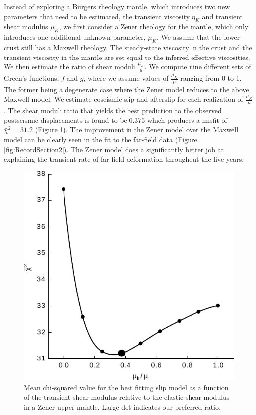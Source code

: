 \documentclass[draft,linenumbers]{AGUJournal}
\begin{document}
Instead of exploring a Burgers rheology mantle, which introduces two new parameters that need to be estimated, the transient viscosity $\eta_{K}$ and transient shear modulus $\mu_{K}$, we first consider a Zener rheology for the mantle, which only introduces one additional unknown parameter, $\mu_{K}$.  We assume that the lower crust still has a Maxwell rheology. The steady-state viscosity in the crust and the transient viscosity in the mantle are set equal to the inferred effective viscosities.  We then estimate the ratio of shear moduli $\frac{\mu_K}{\mu}$. We compute nine different sets of Green's functions, $f$ and $g$, where we assume values of $\frac{\mu_K}{\mu}$ ranging from 0 to 1. The former being a degenerate case where the Zener model reduces to the above Maxwell model.  We estimate coseismic slip and afterslip for each realization of $\frac{\mu_K}{\mu}$.  The shear moduli ratio that yields the best prediction to the observed postseismic displacements is found to be $0.375$ which produces a misfit of $\bar\chi^2=31.2$ (Figure \ref{fig:ShearModulusRatio}).  The improvement in the Zener model over the Maxwell model can be clearly seen in the fit to the far-field data (Figure \ref{fig:RecordSection2}). The Zener model does a significantly better job at explaining the transient rate of far-field deformation throughout the five years.  

\begin{figure}
\includegraphics[scale=0.8]{Figures/RatioMisfit}
\centering 
\caption{Mean chi-squared value for the best fitting slip model as a function of the transient shear modulus relative to the elastic shear modulus in a Zener upper mantle. Large dot indicates our preferred ratio.}
\label{fig:ShearModulusRatio}
\end{figure}
\end{document}

